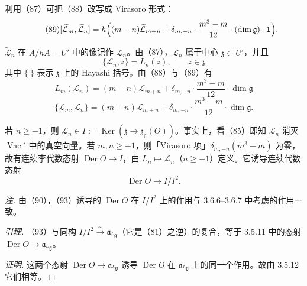 利用（87）可把（88）改写成 Virasoro 形式：
\begin{equation}\tag{89}
[\widetilde{\mathcal{L}}_{m}, \widetilde{\mathcal{L}}_{n}] = h\Bigl((m-n)\widetilde{\mathcal{L}}_{m+n} + \delta_{m,-n}\cdot\frac{m^{3}-m}{12}\cdot(\dim\mathfrak{g})\cdot\mathbf{1}\Bigr).
\end{equation}

 $\widetilde{\mathcal{L}}_{n}$ 在 $A/hA = \overline{U}'$ 中的像记作 $\mathcal{L}_{n}$。由（87），$\mathcal{L}_{n}$ 属于中心 $\mathfrak{z} \subset \overline{U}'$，并且
\begin{equation}\tag{90}
\{\mathcal{L}_{n}, z\} = L_{n}(z), \qquad z \in \mathfrak{z}
\end{equation}
其中 $\{\ \}$ 表示 $\mathfrak{z}$ 上的 Hayashi 括号。由（88）与（89）有
\begin{equation}\tag{91}
L_{m}(\mathcal{L}_{n}) = (m-n)\mathcal{L}_{m+n} + \delta_{m,-n}\cdot\frac{m^{3}-m}{12}\cdot\dim\mathfrak{g}
\end{equation}
\begin{equation}\tag{92}
\{\mathcal{L}_{m}, \mathcal{L}_{n}\} = (m-n)\mathcal{L}_{m+n} + \delta_{m,-n}\cdot\frac{m^{3}-m}{12}\cdot\dim\mathfrak{g}.
\end{equation}

 若 $n \ge -1$，则 $\mathcal{L}_{n} \in I := \operatorname{Ker}(\mathfrak{z} \to \mathfrak{z}_{\mathfrak{g}}(O))$。事实上，看（85）即知 $\mathcal{L}_{n}$ 消灭 $\operatorname{Vac}'$ 中的真空向量。若 $m, n \ge -1$，则「Virasoro 项」$\delta_{m,-n}(m^{3}-m)$ 为零，故有连续李代数态射 $\operatorname{Der} O \to I$，由 $L_{n} \mapsto \mathcal{L}_{n}$（$n \ge -1$）定义。它诱导连续代数态射
\begin{equation}\tag{93}
\operatorname{Der} O \to I/I^{2}.
\end{equation}


\emph{注.} 由（90），（93）诱导的 $\operatorname{Der} O$ 在 $I/I^{2}$ 上的作用与 3.6.6--3.6.7 中考虑的作用一致。

 \emph{引理.} （93）与同构 $I/I^{2} \xrightarrow{\sim} \mathfrak{a}_{{}^{L}\mathfrak{g}}$（它是（81）之逆）的复合，等于 3.5.11 中的态射 $\operatorname{Der} O \to \mathfrak{a}_{{}^{L}\mathfrak{g}}$。

\emph{证明.} 这两个态射 $\operatorname{Der} O \to \mathfrak{a}_{{}^{L}\mathfrak{g}}$ 诱导 $\operatorname{Der} O$ 在 $\mathfrak{a}_{{}^{L}\mathfrak{g}}$ 上的同一个作用。故由 3.5.12 它们相等。\hfill$\Box$

